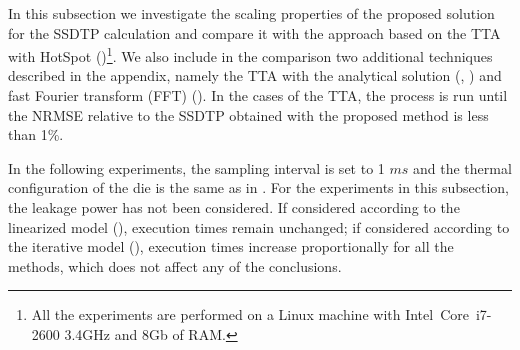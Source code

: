 \begin{table*}
{\begin{tabular}{|r|r|r|r|r|}
      \hline
    \end{tabular}
  }
  \vspace{-10pt}
\end{table*}
In this subsection we investigate the scaling properties of the proposed solution for the SSDTP calculation and compare it with the approach based on the TTA with HotSpot ()\footnote{All the experiments are performed on a Linux machine with Intel\textregistered\ Core\texttrademark\ i7-2600 3.4GHz and 8Gb of RAM.}. We also include in the comparison two additional techniques described in the appendix, namely the TTA with the analytical solution (, ) and fast Fourier transform (FFT) (). In the cases of the TTA, the process is run until the NRMSE relative to the SSDTP obtained with the proposed method is less than 1\%.

In the following experiments, the sampling interval is set to 1 $ms$ and the thermal configuration of the die is the same as in . For the experiments in this subsection, the leakage power has not been considered. If considered according to the linearized model (), execution times remain unchanged; if considered according to the iterative model (), execution times increase proportionally for all the methods, which does not affect any of the conclusions.

